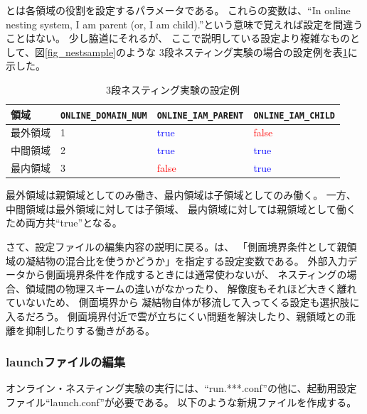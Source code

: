 とは各領域の役割を設定するパラメータである。
これらの変数は、``In online nesting system, I am parent (or, I am child).''という意味で覚えれば設定を間違うことはない。
少し脇道にそれるが、
ここで説明している設定より複雑なものとして、図\ref{fig_nestsample}のような
3段ネスティング実験の場合の設定例を表\ref{tab:triple_nested}に示した。

\begin{table}[htb]
\begin{center}
\caption{3段ネスティング実験の設定例}
\begin{tabularx}{150mm}{|l|l|l|X|} \hline
 \rowcolor[gray]{0.9} 領域 & \verb|ONLINE_DOMAIN_NUM| & \verb|ONLINE_IAM_PARENT| & \verb|ONLINE_IAM_CHILD|\\ \hline
 最外領域 & 1 & \textcolor{blue}{true} & \textcolor{red}{false} \\ \hline
 中間領域 & 2 & \textcolor{blue}{true} & \textcolor{blue}{true} \\ \hline
 最内領域 & 3 & \textcolor{red}{false} & \textcolor{blue}{true} \\ \hline
\end{tabularx}
\label{tab:triple_nested}
\end{center}
\end{table}

\noindent 最外領域は親領域としてのみ働き、最内領域は子領域としてのみ働く。
一方、中間領域は最外領域に対しては子領域、
最内領域に対しては親領域として働くため両方共``true''となる。

さて、設定ファイルの編集内容の説明に戻る。は、
「側面境界条件として親領域の凝結物の混合比を使うかどうか」を指定する設定変数である。
外部入力データから側面境界条件を作成するときには通常使わないが、
ネスティングの場合、領域間の物理スキームの違いがなかったり、
解像度もそれほど大きく離れていないため、
側面境界から
凝結物自体が移流して入ってくる設定も選択肢に入るだろう。
側面境界付近で雲が立ちにくい問題を解決したり、親領域との乖離を抑制したりする働きがある。



\subsubsection{launchファイルの編集}
オンライン・ネスティング実験の実行には、``run.***.conf''の他に、起動用設定ファイル``launch.conf''が必要である。
以下のような新規ファイルを作成する。\\


